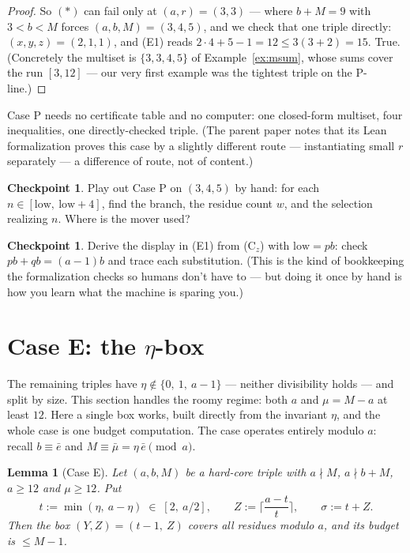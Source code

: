 \documentclass[11pt,reqno]{amsart}
\theoremstyle{plain}
\newtheorem{lemma}[theorem]{Lemma}
\theoremstyle{definition}
\newtheorem{checkpoint}[theorem]{Checkpoint}   %
\theoremstyle{remark}
\begin{document}
\begin{proof}
So $(\ast)$ can fail only at $(a, r) = (3, 3)$ --- where $b + M = 9$ with $3 < b <
M$ forces $(a,b,M) = (3,4,5)$, and we check that one triple directly: $(x,y,z) =
(2,1,1)$, and (E1) reads $2 \cdot 4 + 5 - 1 = 12 \le 3(3 + 2) = 15$. True.
(Concretely the multiset is $\{3,3,4,5\}$ of Example~\ref{ex:msum}, whose sums
cover the run $[3, 12]$ --- our very first example was the tightest triple on the
P-line.)
\end{proof}

Case P needs no certificate table and no computer: one closed-form multiset, four
inequalities, one directly-checked triple. (The parent paper notes that its Lean
formalization proves this case by a slightly different route --- instantiating
small $r$ separately --- a difference of route, not of content.)

\begin{checkpoint}
Play out Case P on $(3, 4, 5)$ by hand: for each $n \in [\mathrm{low},\
\mathrm{low} + 4]$, find the branch, the residue count $w$, and the selection
realizing $n$. Where is the mover used?
\end{checkpoint}

\begin{checkpoint}
Derive the display in (E1) from (C$_z$) with $\mathrm{low} = pb$: check $pb + qb =
(a-1)b$ and trace each substitution. (This is the kind of bookkeeping the
formalization checks so humans don't have to --- but doing it once by hand is how
you learn what the machine is sparing you.)
\end{checkpoint}


\section{Case E: the \texorpdfstring{$\eta$}{eta}-box}\label{sec:caseE-friendly}

The remaining triples have $\eta \notin \{0,\ 1,\ a-1\}$ --- neither divisibility
holds --- and split by size. This section handles the roomy regime: both $a$ and
$\mu = M - a$ at least $12$. Here a single box works, built directly from the
invariant $\eta$, and the whole case is one budget computation. The case operates
entirely modulo $a$: recall $b \equiv \bar e$ and $M \equiv \bar\mu = \eta\,\bar
e \pmod a$.

\begin{lemma}[Case E]\label{lem:caseE-friendly}
Let $(a,b,M)$ be a hard-core triple with $a \nmid M$, $a \nmid b + M$, $a \ge 12$
and $\mu \ge 12$. Put
\[
  t := \min(\eta,\ a - \eta) \;\in\; [2,\ a/2], \qquad
  Z := \Big\lceil \frac{a - t}{t} \Big\rceil, \qquad \sigma := t + Z .
\]
Then the box $(Y, Z) = (t - 1,\ Z)$ covers all residues modulo $a$, and its budget
is $\le M - 1$.
\end{lemma}
\end{document}
